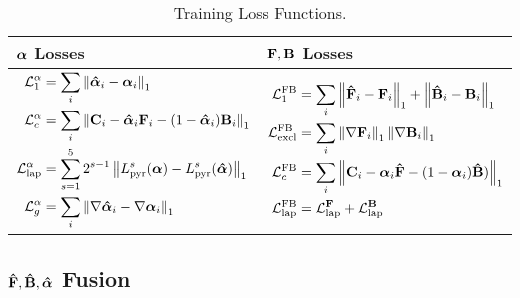 \documentclass[runningheads]{llncs}
\begin{document}
\begin{table}[t]
\centering
  \caption{Training Loss Functions. }
\label{tab:losses}
\begin{tabular}{ll}
\toprule
$\bm{{\alpha}}$ Losses  & $\mathbf{{{F}}} ,\mathbf{{{B}}}$ Losses         \\
\midrule
\begin{minipage}{.5\linewidth}
  $\begin{aligned}
    \mathcal{L}^{\alpha}_1 &= \sum_i \left\| \bm{\hat{\alpha}}_i - \bm{{\alpha}}_i \right\|_1   \\
    \mathcal{L}^{\alpha}_c &= \sum_i \left\| \mathbf{C}_i -  \bm{\hat{\alpha}}_i \mathbf{{{F}}}_i - (1-\bm{\hat{\alpha}}_i) \mathbf{{{B}}}_i \right\|_1  \\
    \mathcal{L}^{\alpha}_{\mathrm{lap}} &=\sum_{s=1}^5 2^{s-1} \left\| L_{\mathrm{pyr}}^s(\bm{{\alpha}}) - L_{\mathrm{pyr}}^s(\bm{\hat{\alpha}}) \right\|_1 \\
    \mathcal{L}^{\alpha}_g &= \sum_i \left\| \nabla \bm{\hat{\alpha}}_i - \nabla \bm{{\alpha}}_i \right\|_{1} \\
\end{aligned}$
\end{minipage}
&
\begin{minipage}{.5\linewidth}
  $\begin{aligned}
    \mathcal{L}^{\mathrm{FB}}_1 &= \sum_i \left\| \mathbf{\hat{{F}}}_i - \mathbf{{{F}}}_i \right\|_1 + \left\| \mathbf{\hat{{B}}}_i - \mathbf{{{B}}}_i \right\|_1  \\
    \mathcal{L}^{\mathrm{FB}}_{\mathrm{excl}} &= \sum_i \left\| \nabla \mathbf{{{F}}}_i \right\|_1 \left\| \nabla \mathbf{{{B}}}_i \right\|_1 \\
\mathcal{L}^{\mathrm{FB}}_c &= \sum_i \left\| \mathbf{C}_i -  \bm{{\alpha}}_i \mathbf{\hat{{F}}} -  (1-\bm{{\alpha}}_i) \mathbf{\hat{{B}}} ) \right\|_1 \\
\mathcal{L}^{\mathrm{FB}}_{\mathrm{lap}} &= \mathcal{L}^{\mathbf{{{F}}}}_{\mathrm{lap}} + \mathcal{L}^{\mathbf{{{B}}}}_{\mathrm{lap}}  \\
 \end{aligned}$ 
\end{minipage} \\
 \bottomrule
\end{tabular}
\end{table}
                

\subsection{$\mathbf{\hat{{F}}},\mathbf{\hat{{B}}},\bm{\hat{\alpha}}$ Fusion}
\end{document}
